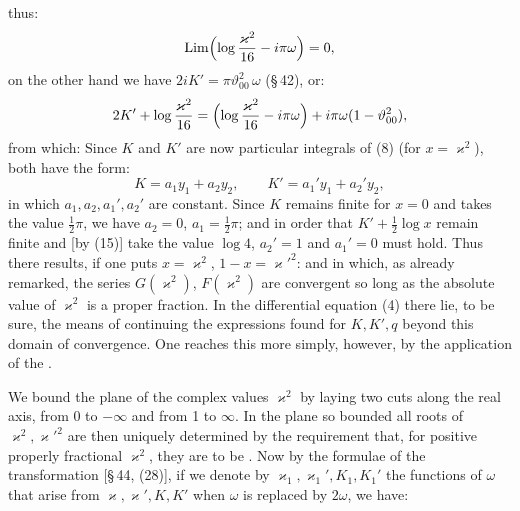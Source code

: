 
thus:
\[
\mathrm{Lim}\Bigl(\log\frac{\varkappa^2}{16} - i\pi\omega\Bigr) = 0,
\]
on the other hand we have $2iK' = \pi\vartheta_{00}^2\,\omega$ (\S\,42), or:
\[
2K' + \log\frac{\varkappa^2}{16} = \Bigl(\log\frac{\varkappa^2}{16} - i\pi\omega\Bigr) + i\pi\omega(1-\vartheta_{00}^2),
\]
from which:
Since $K$ and $K'$ are now particular integrals of (8) (for
$x=\varkappa^2$), both have the form:
\[
K = a_1 y_1 + a_2 y_2, \qquad K' = a_1' y_1 + a_2' y_2,
\]
in which $a_1, a_2, a_1', a_2'$ are constant. Since $K$ remains finite
for $x=0$ and takes the value $\frac12\pi$, we have $a_2=0$, $a_1=\frac12\pi$; and
in order that $K'+\frac12\log x$ remain finite and [by (15)] take the value $\log 4$,
$a_2'=1$ and $a_1'=0$ must hold. Thus there results, if
one puts $x=\varkappa^2$, $1-x=\varkappa'^2$:
and
in which, as already remarked, the series $G(\varkappa^2)$, $F(\varkappa^2)$ are convergent
so long as the absolute value of $\varkappa^2$ is a proper fraction.
In
the differential equation (4) there lie, to be sure, the means of continuing
the expressions found for $K,K',q$ beyond this domain of convergence. %
One reaches this more simply, however, by the
application of the .

We bound the plane of the complex values $\varkappa^2$ by
laying two cuts along the real axis, from 0 to $-\infty$ and
from 1 to $\infty$. In the plane so bounded all
roots of $\varkappa^2, \varkappa'^2$ are then uniquely determined by the requirement that, for
positive properly fractional $\varkappa^2$, they are to be . Now
by the formulae of the  transformation
[\S\,44, (28)], if we denote by $\varkappa_1,\varkappa_1',K_1,K_1'$ the functions of $\omega$
that arise from $\varkappa,\varkappa',K,K'$ when $\omega$ is replaced by $2\omega$,
we have:
